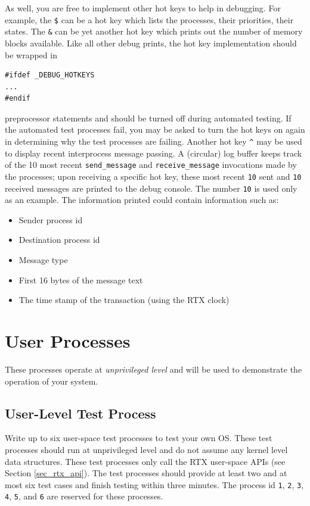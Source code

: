 As well, you are free to implement other hot keys to help in debugging. For example, the \verb+$+ can be a hot key which lists the processes, their priorities, their states. The \verb+&+ can be yet another hot key which prints out the number of memory blocks available. Like all other debug prints, the hot key implementation should be wrapped in \\
\begin{lstlisting}
#ifdef _DEBUG_HOTKEYS
...
#endif
\end{lstlisting}
preprocessor statements and should be turned off during automated testing. If the automated test processes fail, you may be asked to turn the hot keys on again in determining why the test processes are failing.
Another hot key \verb+^+ may be used to display recent interprocess message passing. A (circular) log buffer keeps track of the 10 most recent \verb+send_message+ and \verb+receive_message+ invocations made by the processes; upon receiving a specific hot key, these most recent \verb+10+ sent and \verb+10+ received messages are printed to the debug console. The number \verb+10+ is used only as an example. The information printed could contain information such as:
\begin{itemize}
\item Sender process id 
\item Destination process id 
\item Message type 
\item First 16 bytes of the message text 
\item The time stamp of the transaction (using the RTX clock) 
\end{itemize}

\section{User Processes}
These processes operate at {\em unprivileged level} and will be used to demonstrate the operation of your system.

\subsection{User-Level Test Process}
\label{subsec_test_procs}

Write up to six user-space test processes to test your own OS. These test processes should run at unprivileged level and do not assume any kernel level data structures. These test processes only call the RTX user-space APIs (see Section \ref{sec_rtx_api}). The test processes should provide at least two and at most six test cases and finish testing within three minutes. The process id \verb+1+, \verb+2+, \verb+3+, \verb+4+, \verb+5+, and \verb+6+ are reserved for these processes.

